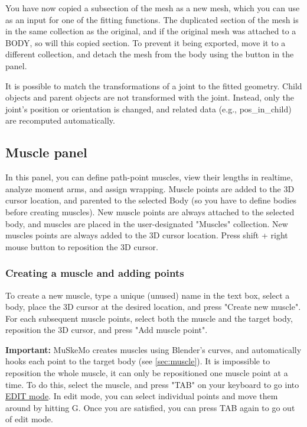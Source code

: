 \documentclass{article}
\begin{document}
You have now copied a subsection of the mesh as a new mesh, which you can use as an input for one of the fitting functions. The duplicated section of the mesh is in the same collection as the original, and if the original mesh was attached to a BODY, so will this copied section. To prevent it being exported, move it to a different collection, and detach the mesh from the body using the button in the panel.

It is possible to match the transformations of a joint to the fitted geometry. Child objects and parent objects are not transformed with the joint. Instead, only the joint's position or orientation is changed, and related data (e.g., pos\_in\_child) are recomputed automatically.

\subsection{Muscle panel}

In this panel, you can define path-point muscles, view their lengths in realtime, analyze moment arms, and assign wrapping. Muscle points are added to the 3D cursor location, and parented to the selected Body (so you have to define bodies before creating muscles). New muscle points are always attached to the selected body, and muscles are placed in the user-designated "Muscles" collection. New muscles points are always added to the 3D cursor location. Press shift + right mouse button to reposition the 3D cursor. 

\subsubsection{Creating a muscle and adding points}

To create a new muscle, type a unique (unused) name in the text box, select a body, place the 3D cursor at the desired location, and press "Create new muscle". For each subsequent muscle points, select both the muscle and the target body, reposition the 3D cursor, and press "Add muscle point".

\textbf{Important:} MuSkeMo creates muscles using Blender's curves, and automatically hooks each point to the target body (see \ref{sec:muscle}). It is impossible to reposition the whole muscle, it can only be repositioned one muscle point at a time. To do this, select the muscle, and press "TAB" on your keyboard to go into \href{https://docs.blender.org/manual/en/latest/editors/3dview/modes.html}{EDIT mode}. In edit mode, you can select individual points and move them around by hitting G. Once you are satisfied, you can press TAB again to go out of edit mode.
\end{document}
